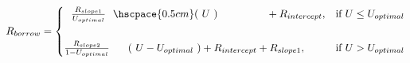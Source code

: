 \documentclass[preview]{standalone}
\begin{document}
\begin{align*}
R_{borrow} =\begin{cases} \ \ \frac{R_{slope1}}{U_{optimal}}\ \ \hscpace{0.5cm} (\ U \ )\ \ \ \ \ \ \ \ \ \ \ \ \ \  + R_{intercept}, & \text{if } U \leq U_{optimal} \\\\[0.3em] \frac{R_{slope2}}{1-U_{optimal}}\ \hspace{0.5cm} (\ U-U_{optimal}\ ) + R_{intercept} + R_{slope1}, & \text{if } U > U_{optimal} \end{cases}
\end{align*}
\end{document}
